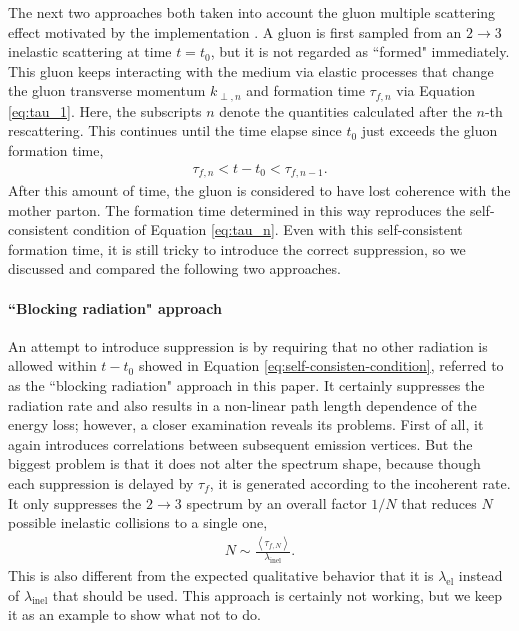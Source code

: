 \documentclass[aps, prc, reprint, amsmath, groupedaddress, nofootinbib]{revtex4-1}
\begin{document}
The next two approaches both taken into account the gluon multiple scattering effect motivated by the implementation \cite{Zapp:2011ya}.
A gluon is first sampled from an $2\rightarrow3$ inelastic scattering at time $t=t_0$, but it is not regarded as ``formed" immediately. 
This gluon keeps interacting with the medium via elastic processes that change the gluon transverse momentum $k_{\perp,n}$ and formation time $\tau_{f,n}$ via Equation \ref{eq:tau_1}.
Here, the subscripts $n$ denote the quantities calculated after the $n$-th rescattering.
This continues until the time elapse since $t_0$ just exceeds the gluon formation time,
\begin{eqnarray}\label{eq:self-consisten-condition}
\tau_{f, n} < t-t_0 < \tau_{f, n-1}.
\end{eqnarray}
After this amount of time, the gluon is considered to have lost coherence with the mother parton.
The formation time determined in this way reproduces the self-consistent condition of Equation \ref{eq:tau_n}.
Even with this self-consistent formation time, it is still tricky to introduce the correct suppression, so we discussed and compared the following two approaches. 

\paragraph*{``Blocking radiation" approach}
An attempt to introduce suppression is by requiring that no other radiation is allowed within $t-t_0$ showed in Equation \ref{eq:self-consisten-condition}, referred to as the ``blocking radiation" approach in this paper.
It certainly suppresses the radiation rate and also results in a non-linear path length dependence of the energy loss; however, a closer examination reveals its problems.
First of all, it again introduces correlations between subsequent emission vertices.
But the biggest problem is that it does not alter the spectrum shape, because though each suppression is delayed by $\tau_f$, it is generated according to the incoherent rate. 
It only suppresses the $2\rightarrow 3$ spectrum by an overall factor $1/N$ that reduces $N$ possible inelastic collisions to a single one,
\begin{eqnarray}
N \sim \frac{\left\langle\tau_{f,N}\right\rangle}{ \lambda_{\textrm{inel}}}.
\end{eqnarray}
This is also different from the expected qualitative behavior that it is  $\lambda_{\textrm{el}}$ instead of $\lambda_{\textrm{inel}}$ that should be used.
This approach is certainly not working, but we keep it as an example to show what not to do.
\end{document}

